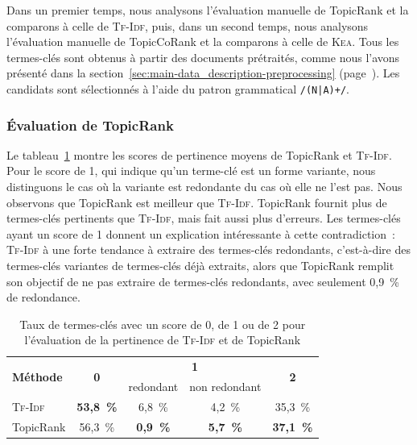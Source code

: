       Dans un premier temps, nous analysons l'évaluation manuelle de TopicRank
      et la comparons à celle de \textsc{Tf-Idf}, puis, dans un second temps,
      nous analysons l'évaluation manuelle de TopicCoRank et la comparons à
      celle de \textsc{Kea}. Tous les termes-clés sont obtenus à partir des
      documents prétraités, comme nous l'avons présenté dans la
      section~\ref{sec:main-data_description-preprocessing}
      (page~\pageref{sec:main-data_description-preprocessing}). Les candidats
      sont sélectionnés à l'aide du patron grammatical \texttt{/(N|A)+/}.

      \subsubsection{Évaluation de TopicRank}
      \label{subsubsec:main-domain_specific_keyphrase_annotation-manual_evaluation-analysis-topicrank}
        Le
        tableau~\ref{tab:main-automatic_evaluation_of_keyphrase_annotation-results-topicrank-pertinence_score_ratio}
        montre les scores de pertinence moyens de TopicRank et \textsc{Tf-Idf}. Pour le score
        de 1, qui indique qu'un terme-clé est un forme variante, nous
        distinguons le cas où la variante est redondante du cas où elle ne l'est
        pas. Nous observons que TopicRank est meilleur que
        \textsc{Tf-Idf}. TopicRank fournit plus de termes-clés pertinents que
        \textsc{Tf-Idf}, mais fait aussi plus d'erreurs. Les termes-clés ayant
        un score de 1 donnent un explication intéressante à cette
        contradiction~: \textsc{Tf-Idf} à une forte tendance à extraire des
        termes-clés redondants, c'est-à-dire des termes-clés variantes de
        termes-clés déjà extraits, alors que TopicRank remplit son
        objectif de ne pas extraire de termes-clés redondants, avec seulement
        0,9~\% de redondance.
        \begin{table}[h!]
          \centering
          \begin{tabular}{l|c|c|c|c}
            \toprule
            \multirow{2}{*}{\textbf{Méthode}} & \multirow{2}{*}{\textbf{0}} & \multicolumn{2}{c|}{\textbf{1}} & \multirow{2}{*}{\textbf{2}}\\
            \cline{3-4}
            & & \multicolumn{1}{p{.175\linewidth}|}{\centering{}redondant} & \multicolumn{1}{p{.175\linewidth}|}{\centering{}non redondant} &\\
            \hline
            \textsc{Tf-Idf} & \textbf{53,8~\%} & 6,8~\% & 4,2~\% & 35,3~\%\\
            TopicRank & 56,3~\% & \textbf{0,9~\%} & \textbf{5,7~\%} & \textbf{37,1~\%}\\
            \bottomrule
          \end{tabular}
          \caption{Taux de termes-clés avec un score de 0, de 1 ou de 2 pour
                   l'évaluation de la pertinence de \textsc{Tf-Idf} et de
                   TopicRank
                   \label{tab:main-automatic_evaluation_of_keyphrase_annotation-results-topicrank-pertinence_score_ratio}}
        \end{table}

